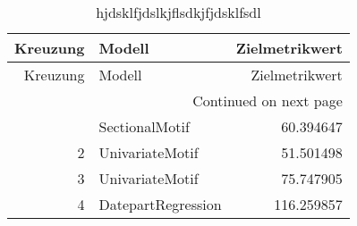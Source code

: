 \begin{longtable}{|r|l|r|}
\label{tab:results}
\caption{hjdsklfjdslkjflsdkjfjdsklfsdl}
\hline
\toprule
 Kreuzung &             Modell &  Zielmetrikwert \\
\midrule
\endfirsthead
\hline
\toprule
 Kreuzung &             Modell &  Zielmetrikwert \\
\midrule
\endhead
\midrule
\multicolumn{3}{r}{{Continued on next page}} \\
\midrule
\endfoot

\bottomrule
\endlastfoot
        1 &     SectionalMotif &       60.394647 \\
        2 &    UnivariateMotif &       51.501498 \\
        3 &    UnivariateMotif &       75.747905 \\
        4 & DatepartRegression &      116.259857 \\
\hline
\end{longtable}
